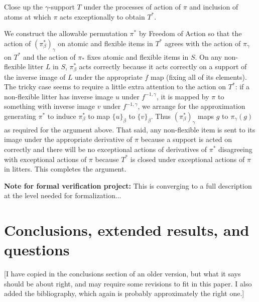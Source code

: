 \documentclass[112pt]{article}
\begin{document}
Close up the $\gamma$-support $T$ under the processes of action of $\pi$ and inclusion of atoms at which $\pi$ acts exceptionally to obtain $T^*$.

We construct the allowable permutation $\pi^*$ by Freedom of Action so that the action of $(\pi^*_\beta)_\gamma$ on atomic and flexible items in $T^*$ agrees with the action of $\pi_\gamma$ on $T^*$
and the action of $\pi_*$ fixes atomic and flexible items in $S$.  On any non-flexible litter $L$ in $S$, $\pi^*_\beta$ acts correctly because it acts correctly on a support of the inverse image of $L$ under the appropriate $f$ map (fixing all of its elements).
The tricky case seems to require a little extra attention to the action on $T^*$:  if a non-flexible litter has inverse image $u$ under $f^{-1,\gamma}$, it is mapped by $\pi$ to something with inverse image $v$ under $f^{-1,\gamma}$, we arrange for the
approximation generating $\pi^*$ to induce
$\pi^*_\beta$ to map $\{u\}_\beta$ to $\{v\}_\beta$.  Thus  $(\pi^*_\beta)_\gamma$ maps $g$ to $\pi_\gamma(g)$ as required for the argument above.  That said, any non-flexible item is sent to its image under the appropriate derivative of $\pi$ because
a support is acted on correctly and there will be no exceptional actions of derivatives of $\pi^*$ disagreeing with exceptional actions of $\pi$ because $T^*$ is closed under exceptional actions of $\pi$ in litters.  This completes the argument.

\begin{comment}
NOTE:  Difficult interactions with $S$ are avoided because an incompatibility of $\pi$ with fixing $S$ would involve moving most elements of a litter in the range of $f_{-1,\beta}$, and while $\pi$ may do this, nothing in the definition
of $\pi^*$ can force this to happen;  there is no conflict between the conditions imposed by $S$ and the conditions imposed by $T^*$.
\end{comment}














{\bf Note for formal verification project:}  This is converging to a full description at the level needed for formalization...

\newpage

\section{Conclusions, extended results, and questions}
[I have copied in the conclusions section of an older version, but what it says should be about right, 
and may require some revisions to fit in this paper.  I also added the bibliography, which again is probably approximately the right one.]
\end{document}
